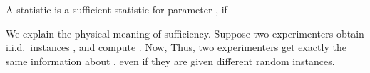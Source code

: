 A statistic  is a sufficient statistic for parameter \M {\Gq}, if

We explain the physical meaning of sufficiency.
Suppose two experimenters obtain i.i.d.\ instances , and compute .
Now,
Thus, two experimenters get exactly the same information about \M {\Gq}, even if they are given different random instances.
